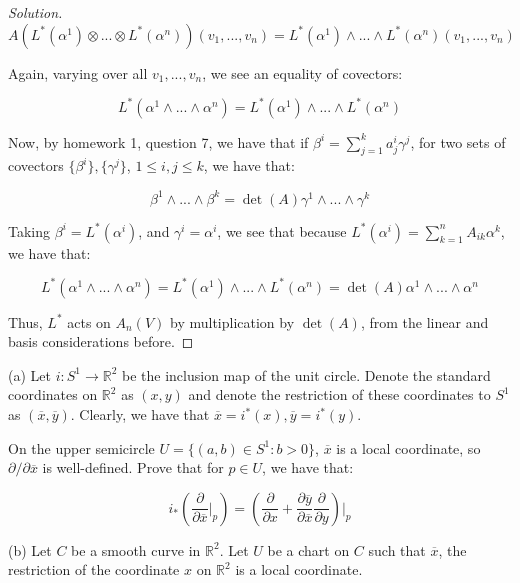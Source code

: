 \documentclass[10pt]{article}
\theoremstyle{nonumberplain}%
\newenvironment{problem}[2][]{\begin{trivlist}
\item[\hskip \labelsep {\bfseries #1}\hskip \labelsep {\bfseries #2.}]}{\end{trivlist}}
\begin{document}
\begin{proof}[Solution]
$$  A(L^*(\alpha^1) \otimes ... \otimes L^*(\alpha^n))(v_1,...,v_n) = L^*(\alpha^1) \wedge ... \wedge L^*(\alpha^n)(v_1,...,v_n) $$

Again, varying over all $v_1,...,v_n$, we see an equality of covectors:

$$  L^*(\alpha^1 \wedge ... \wedge \alpha^n) =  L^*(\alpha^1) \wedge ... \wedge L^*(\alpha^n) $$

Now, by homework 1, question 7, we have that if $ \beta^i  = \sum_{j=1}^k a_j^i \gamma^j$, for two sets of covectors $\{\beta^i\},\{ \gamma^j\}$, $1 \leq i,j \leq k$, we have that:

$$ \beta^1 \wedge ... \wedge \beta^k = \det(A) \gamma^1 \wedge ... \wedge \gamma^k$$

Taking $\beta^i = L^*(\alpha^i)$, and $\gamma^i = \alpha^i$, we see that because $ L^*(\alpha^i) = \sum_{k=1}^n A_{ik}\alpha^k$, we have that:

$$  L^*(\alpha^1 \wedge ... \wedge \alpha^n) =  L^*(\alpha^1) \wedge ... \wedge L^*(\alpha^n) = \det(A) \alpha^1 \wedge ... \wedge \alpha^n $$

Thus, $L^*$ acts on $A_n(V)$ by multiplication by $\det(A)$, from the linear and basis considerations before.

\end{proof}

\begin{problem}{Question 3}

(a) Let $i: S^1 \to \mathbb{R}^2$ be the inclusion map of the unit circle. Denote the standard coordinates on $\mathbb{R}^2$ as $(x,y)$ and denote the restriction of these coordinates to $S^1$ as $(\overline{x}, \overline{y})$. Clearly, we have that $\overline{x} = i^*(x), \overline{y} = i^*(y)$. 

On the upper semicircle $U = \{ (a,b) \in S^1 : b > 0 \}$, $\overline{x}$ is a local coordinate, so $\partial/\partial \overline{x}$ is well-defined. Prove that for $p\in U$, we have that:

$$i_* \left( \frac{\partial}{\partial \overline{x}} \bigg|_p \right) = \left( \frac{\partial}{\partial x} + \frac{\partial \overline{y}}{\partial \overline{x}} \frac{\partial}{\partial y} \right)\bigg|_p$$

(b) Let $C$ be a smooth curve in $\mathbb{R}^2$. Let $U$ be a chart on $C$ such that $\overline{x}$, the restriction of the coordinate $x$ on $\mathbb{R}^2$ is a local coordinate.

\end{problem}
\end{document}
